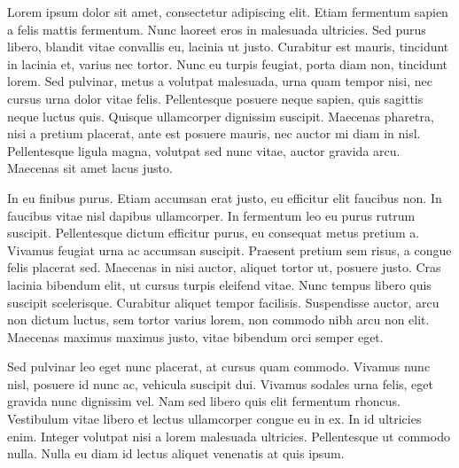 \begin{center}
{
}
\end{center}

Lorem ipsum dolor sit amet, consectetur adipiscing elit. Etiam fermentum sapien a felis mattis fermentum. Nunc laoreet eros in malesuada ultricies. Sed purus libero, blandit vitae convallis eu, lacinia ut justo. Curabitur est mauris, tincidunt in lacinia et, varius nec tortor. Nunc eu turpis feugiat, porta diam non, tincidunt lorem. Sed pulvinar, metus a volutpat malesuada, urna quam tempor nisi, nec cursus urna dolor vitae felis. Pellentesque posuere neque sapien, quis sagittis neque luctus quis. Quisque ullamcorper dignissim suscipit. Maecenas pharetra, nisi a pretium placerat, ante est posuere mauris, nec auctor mi diam in nisl. Pellentesque ligula magna, volutpat sed nunc vitae, auctor gravida arcu. Maecenas sit amet lacus justo.

\vspace{2mm}

In eu finibus purus. Etiam accumsan erat justo, eu efficitur elit faucibus non. In faucibus vitae nisl dapibus ullamcorper. In fermentum leo eu purus rutrum suscipit. Pellentesque dictum efficitur purus, eu consequat metus pretium a. Vivamus feugiat urna ac accumsan suscipit. Praesent pretium sem risus, a congue felis placerat sed. Maecenas in nisi auctor, aliquet tortor ut, posuere justo. Cras lacinia bibendum elit, ut cursus turpis eleifend vitae. Nunc tempus libero quis suscipit scelerisque. Curabitur aliquet tempor facilisis. Suspendisse auctor, arcu non dictum luctus, sem tortor varius lorem, non commodo nibh arcu non elit. Maecenas maximus maximus justo, vitae bibendum orci semper eget.

\vspace{2mm}

Sed pulvinar leo eget nunc placerat, at cursus quam commodo. Vivamus nunc nisl, posuere id nunc ac, vehicula suscipit dui. Vivamus sodales urna felis, eget gravida nunc dignissim vel. Nam sed libero quis elit fermentum rhoncus. Vestibulum vitae libero et lectus ullamcorper congue eu in ex. In id ultricies enim. Integer volutpat nisi a lorem malesuada ultricies. Pellentesque ut commodo nulla. Nulla eu diam id lectus aliquet venenatis at quis ipsum.

